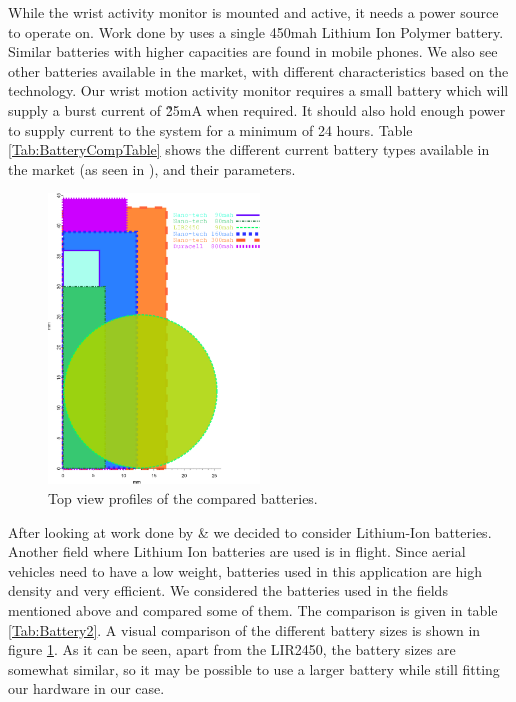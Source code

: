 While the wrist activity monitor is mounted and active, it needs a power source to operate on. Work done by \cite{Web:ShimmerHome} uses a single 450mah Lithium Ion Polymer battery. Similar batteries with higher capacities are found in mobile phones. We also see other batteries available in the market, with different characteristics based on the technology. Our wrist motion activity monitor requires a small battery which will supply a burst current of \~25mA when required. It should also hold enough power to supply current to the system for a minimum of 24 hours. Table \ref{Tab:BatteryCompTable} shows the different current battery types available in the market (as seen in \cite{Web:BatteryTable}), and their parameters.
\begin{figure}
\begin{center}
\includegraphics[width=0.5\textwidth]{images/battcompare.eps}
\caption{Top view profiles of the compared batteries.}
\label{Fig:BattComp}
\end{center}
\end{figure}
After looking at work done by \cite{Web:ShimmerHome} \& \cite{drennan2010assessment} we decided to consider Lithium-Ion batteries. Another field where Lithium Ion batteries are used is in flight. Since aerial vehicles need to have a low weight, batteries used in this application are high density and very efficient. We considered the batteries used in the fields mentioned above and compared some of them. The comparison is given in table \ref{Tab:Battery2}. A visual comparison of the different battery sizes is shown in figure \ref{Fig:BattComp}. As it can be seen, apart from the LIR2450, the battery sizes are somewhat similar,
so it may be possible to use a larger battery while still fitting our hardware in our case.

